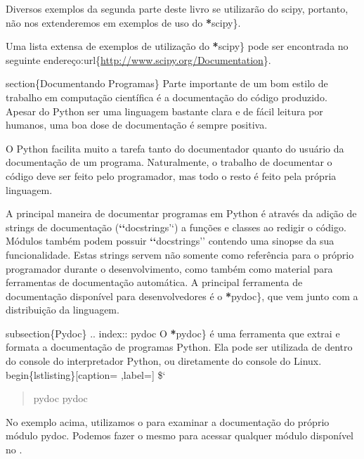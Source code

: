 \documentclass[a4paper,10pt,portuguese]{sphinxmanual}
\begin{document}
Diversos exemplos da segunda parte deste livro se utilizarão do scipy, portanto, não nos extenderemos em exemplos de uso do {\color{red}\bfseries{}*}scipy\}.

Uma lista extensa de exemplos de utilização do {\color{red}\bfseries{}*}scipy\} pode ser encontrada no seguinte endereço:url\{\href{http://www.scipy.org/Documentation}{http://www.scipy.org/Documentation}\}.

section\{Documentando Programas\}
Parte importante de um bom estilo de trabalho em computação científica é a documentação do código produzido. Apesar do Python ser uma linguagem bastante clara e de fácil leitura por humanos, uma boa dose de documentação é sempre positiva.

O Python facilita muito a tarefa tanto do documentador quanto do usuário da documentação de um programa. Naturalmente, o trabalho de documentar o código deve ser feito pelo programador, mas todo o resto é feito pela própria linguagem.

A principal maneira de documentar programas em Python é através da adição de strings de documentação ({\color{red}\bfseries{}{}`{}`}docstrings'`) a funções e classes ao redigir o código. Módulos também podem possuir {\color{red}\bfseries{}{}`{}`}docstrings'' contendo uma sinopse da sua funcionalidade. Estas strings servem não somente como referência para o próprio programador durante o desenvolvimento, como também como material para ferramentas de documentação automática. A principal ferramenta de documentação disponível para desenvolvedores é o {\color{red}\bfseries{}*}pydoc\}, que vem junto com a distribuição  da linguagem.

subsection\{Pydoc\}
.. index:: pydoc
O {\color{red}\bfseries{}*}pydoc\} é uma ferramenta que extrai e formata a documentação de programas Python. Ela pode ser utilizada de dentro do console do interpretador Python, ou diretamente do console do Linux.
begin\{lstlisting\}{[}caption= ,label={]}
\${}`
\begin{quote}

pydoc pydoc
\end{quote}

No exemplo acima, utilizamos o  para examinar a
documentação do próprio módulo pydoc. Podemos fazer o mesmo para
acessar qualquer módulo disponível no .
\end{document}
